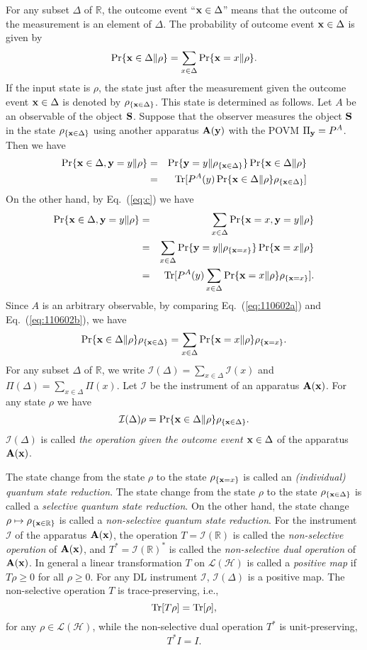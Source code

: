 \documentclass[12pt]{article}
\newcommand{\beq}{\begin{equation}}
\newcommand{\eeq}{\end{equation}}
\newcommand{\beqa}{\begin{eqnarray}}
\newcommand{\eeqa}{\end{eqnarray}}
\newcommand{\bA}{{\bf A}}
\newcommand{\bS}{{\bf S}}
\newcommand{\cH}{{\mathcal H}}
\newcommand{\cI}{{\mathcal I}}
\newcommand{\cL}{{\mathcal L}}
\newcommand{\nn}{\nonumber}
\newcommand{\rh}{\rho}
\newcommand{\De}{\Delta}
\newcommand{\Eq}[1]{Eq.~(\ref{eq:#1})}
\newcommand{\Tr}{\mbox{\rm Tr}}
\newcommand{\bx}{{\bf x}}
\newcommand{\by}{{\bf y}}
\newcommand{\R}{\mathbb{R}}
\begin{document}
For any subset $\De$ of $\R$, the outcome event ``$\bx\in\De$'' 
means that the outcome of the measurement is an element of 
$\De$.  The probability of outcome event $\bx\in\De$ is given by
\beq
\Pr\{\bx\in\De\|\rh\}=\sum_{x\in\De}\Pr\{\bx=x\|\rh\}.
\eeq
If the input state is  $\rh$, the state just after the measurement given
 the outcome event $\bx\in\De$ 
is denoted by $\rh_{\{\bx\in\De\}}$.
This state is determined as follows.
Let $A$ be an observable of the object $\bS$.
Suppose that the observer measures the object $\bS$ in the state $\rh_{\{\bx\in\De\}}$ 
using  another apparatus   $\bA(\by)$  with the POVM $\Pi_{\by}=P^{A}$. 
Then we have
\beqa
\Pr\{\bx\in\De,\by=y\|\rh\}&=&\Pr\{\by=y\|\rh_{\{\bx\in\De\}}\}\Pr\{\bx\in\De\|\rh\}\nn\\
&=&\Tr[P^{A}(y)\Pr\{\bx\in\De\|\rh\}\rh_{\{\bx\in\De\}}]\label{eq:110602a}
\eeqa
On the other hand,  by \Eq{c} we have
\beqa
\Pr\{\bx\in\De,\by=y\|\rh\}
&=&\sum_{x\in\De}\Pr\{\bx=x,\by=y\|\rh\}\nn\\
&=&\sum_{x\in\De}\Pr\{\by=y\|\rh_{\{\bx=x\}}\}\Pr\{\bx=x\|\rh\}\nn\\
&=&\Tr[P^{A}(y)\sum_{x\in\De}\Pr\{\bx=x\|\rh\}\rh_{\{\bx=x\}}].
\label{eq:110602b}
\eeqa
Since $A$ is an arbitrary observable, 
 by comparing \Eq{110602a} and \Eq{110602b},
we have 
\beq
\Pr\{\bx\in\De\|\rh\}\rh_{\{\bx\in\De\}}=
\sum_{x\in\De}\Pr\{\bx=x\|\rh\}\rh_{\{\bx=x\}}.
\eeq
For any subset $\De$ of $\R$, we write
 $\cI(\De)=\sum_{x\in\De}\cI(x)$ and $\Pi(\De)=\sum_{x\in\De}\Pi(x)$.
Let  $\cI$  be the instrument of an apparatus  $\bA(\bx)$.
For any state  $\rh$ we have
\beq
\cI(\De)\rh=\Pr\{\bx\in\De\|\rh\}\rh_{\{\bx\in\De\}}.
\eeq
$\cI(\De)$ is called {\em the operation given the outcome event
$\bx\in\De$} of the apparatus $\bA(\bx)$.

The state change from the state  $\rh$ to the state $\rh_{\{\bx=x\}}$ 
is called an {\em (individual) quantum state reduction}.
The state change from the state  $\rh$ to the state $\rh_{\{\bx\in\De\}}$ 
is called a {\em selective quantum state reduction}.
On the other hand, the state change $\rh\mapsto\rh_{\{\bx\in\R\}}$ is called 
a {\em  non-selective quantum state reduction}.
For the instrument $\cI$  of the apparatus $\bA(\bx)$,
the operation  $T=\cI(\R)$ is called the {\em non-selective operation}  of $\bA(\bx)$,
and $T^{*}=\cI(\R)^{*}$ is called  the  {\em  non-selective dual operation} of 
$\bA(\bx)$.
In general a linear transformation $T$ on $\cL(\cH)$ is called a {\em positive map}
if $T\rh\ge 0$ for all $\rh\ge 0$.
For any DL instrument $\cI$, $\cI(\De)$ is a positive map.
The non-selective operation $T$  is trace-preserving, i.e., 
\beq
\Tr[T\rh]=\Tr[\rh],
\eeq
for any $\rh\in\cL(\cH)$,
while the non-selective dual
operation $T^{*}$ is unit-preserving, 
\beq
T^{*}I=I.
\eeq
\end{document}
